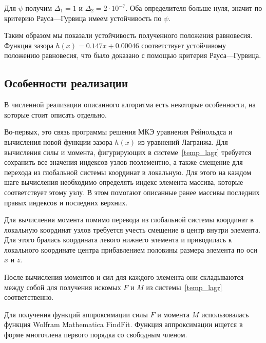 \documentclass[a4paper,14pt]{extarticle}
\begin{document}
Для $\psi$ получим $\Delta_1 = 1$ и  $\Delta_2 = 2 \cdot 10^{-7}$. Оба определителя больше нуля, значит по критерию Рауса—Гурвица имеем устойчивость по $\psi$.

Таким образом мы показали устойчивость полученного положения равновесия. Функция зазора $h(x) = 0.147 x + 0.00046$ соответствует устойчивому положению равновесия, что было доказано с помощью критерия Рауса—Гурвица.

\subsection{Особенности реализации}
В численной реализации описанного алгоритма есть некоторые особенности, на которые стоит описать отдельно.

Во-первых, это связь программы решения МКЭ уравнения Рейнольдса и вычисления новой функции зазора $h(x)$ из уравнений Лагранжа. Для вычисления силы и момента, фигурирующих в системе~\eqref{temp_lagr} требуется сохранить все значения индексов узлов поэлементно, а также смещение для перехода из глобальной системы координат в локальную. Для этого на каждом шаге вычисления необходимо определять индекс элемента массива, которые соответствует этому узлу. В этом помогают описанные ранее массивы последних правых индексов и последних верхних.

Для вычисления момента помимо перевода из глобальной системы координат в локальную координат узлов требуется учесть смещение в центр внутри элемента.  Для этого бралась координата левого нижнего элемента и приводилась к локального координате центра прибавлением половины размера элемента по оси $x$ и $z$.

После вычисления моментов и сил для каждого элемента они складываются между собой для получения искомых $F$ и $M$ из системы~\eqref{temp_lagr} соответственно.

Для получения функций аппроксимации силы $F$ и момента $M$ использовалась функция Wolfram Mathematica FindFit. Функция аппроксимации ищется в форме многочлена первого порядка со свободным членом.




\newpage
\end{document}
